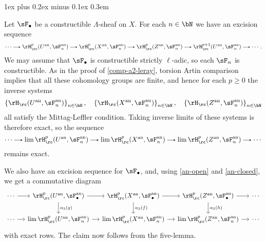 \documentclass[11pt,leqno]{article}
\makeatletter
\newcommand{\thmheadfont}{\scshape}
\newcommand{\thmhorizspace}{0.3em}
\newcommand{\thmsep}{\hspace{\thmhorizspace}---}
\renewenvironment{proof}[1][Proof]{\par
  \pushQED{\qed}%
  \normalfont%
  \topsep1ex plus 0.2ex minus 0.1ex\relax%
  \labelsep \thmhorizspace\relax%
  \trivlist
  \item[\hskip\labelsep\thmheadfont#1\@addpunct{\thmsep}]\ignorespaces
}{%
  \popQED\endtrivlist\@endpefalse%
}
\theoremstyle{block}
\numberwithin{subblock}{block}
\numberwithin{equation}{subblock}
\newcommand{\arrlen}{1.25em}
\renewcommand{\to}{\mathrel{\tikz[baseline]%
    \draw[>=stealth,->](0,0.5ex)--(\arrlen,0.5ex);}}
\newcommand{\inj}{\mathrel{\tikz[baseline]%
    \draw[>=stealth,right hook->](0,0.5ex)--(\arrlen,0.5ex);}}
\renewcommand{\l}{\left}
\renewcommand{\r}{\right}
\renewcommand{\c}{\colon}
\numberwithin{block}{section}
\makeatother
\begin{document}
\begin{nothing}
\begin{sublemma}
    \begin{proof}
      Let $\sF_\bullet$ be a constructible $\Lambda$-sheaf on $X$. For each $n \in \bN$ we have an excision sequence
      \[
        \cdots \to \rH_\rc^p(U^\an, \sF_n^\an) \to \rH_\rc^p(X^\an, \sF_n^\an) \to \rH_\rc^p(Z^\an, \sF_n^\an) \to \rH_\rc^{p+1}(U^\an, \sF_n^\an) \to \cdots.
      \]
      We may assume that $\sF_\bullet$ is constructible strictly $\ell$-adic, so each $\sF_n$ is constructible. As in the proof of \cref{comp-a2-leray}, torsion Artin comparison implies that all these cohomology groups are finite, and hence for each $p \ge 0$ the inverse systems
      \[
        \l\{\rH_\rc(U^\an, \sF_n^\an)\r\}_{n \in \bN}, \quad
        \l\{\rH_\rc(X^\an, \sF_n^\an)\r\}_{n \in \bN}, \quad
        \l\{\rH_\rc(Z^\an, \sF_n^\an)\r\}_{n \in \bN}
      \]
      all satisfy the Mittag-Leffler condition. Taking inverse limits of these systems is therefore exact, so the sequence
      \[
        \cdots \to \lim \rH_\rc^p(U^\an, \sF_n^\an) \to \lim \rH_\rc^p(X^\an, \sF_n^\an) \to \lim \rH_\rc^p(Z^\an, \sF_n^\an) \to \cdots
      \]
      remains exact.

      We also have an excision sequence for $\sF_\bullet$, and, using \cref{an-open} and \cref{an-closed}, we get a commutative diagram
      \[
        \begin{tikzcd}[column sep = small]
          \cdots \ar[r] &
          \rH_\rc^p(U^\an, \sF_\bullet^\an) \ar[r] \ar[d, "\alpha_2(g)"] &
          \rH_\rc^p(X^\an, \sF_\bullet^\an) \ar[r] \ar[d, "\alpha_2(f)"] &
          \rH_\rc^p(Z^\an, \sF_\bullet^\an) \ar[r] \ar[d, "\alpha_2(h)"] &
          \cdots \\
          \cdots \ar[r] &
          \lim\rH_\rc^p(U^\an, \sF_n^\an) \ar[r] &
          \lim\rH_\rc^p(X^\an, \sF_n^\an) \ar[r] &
          \lim\rH_\rc^p(Z^\an, \sF_n^\an) \ar[r] &
          \cdots
        \end{tikzcd}
      \]
      with exact rows. The claim now follows from the five-lemma.
    \end{proof}
  \end{sublemma}




\end{nothing}
\end{document}
